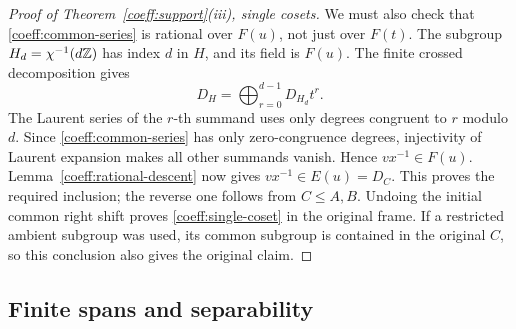 \begin{proof}[Proof of Theorem~\ref{coeff:support}(iii), single cosets]
We must also check that \eqref{coeff:common-series} is rational over
\(F(u)\), not just over \(F(t)\). The subgroup
\(H_d=\chi^{-1}(d\mathbb Z)\) has index \(d\) in \(H\), and its field is
\(F(u)\). The finite crossed decomposition gives
\[
 D_H=\bigoplus_{r=0}^{d-1}D_{H_d}t^r.
\]
The Laurent series of the \(r\)-th summand uses only degrees congruent
to \(r\) modulo \(d\). Since \eqref{coeff:common-series} has only
zero-congruence degrees, injectivity of Laurent expansion makes all
other summands vanish. Hence \(vx^{-1}\in F(u)\).
Lemma~\ref{coeff:rational-descent} now gives
\(vx^{-1}\in E(u)=D_C\). This proves the required inclusion; the
reverse one follows from \(C\le A,B\). Undoing the initial common
right shift proves \eqref{coeff:single-coset} in the original frame.
If a restricted ambient subgroup was used, its common subgroup is
contained in the original \(C\), so this conclusion also gives the
original claim.
\end{proof}

\subsection{Finite spans and separability}

